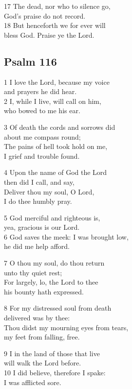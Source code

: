 17 The dead, nor who to silence go,\\
God’s praise do not record.\\
18 But henceforth we for ever will\\
bless God. Praise ye the Lord.

\begin{center}
\quad{}\quad{}
\end{center}

\subsection*{Psalm 116}

1 I love the Lord, because my voice\\
and prayers he did hear.\\
2 I, while I live, will call on him,\\
who bowed to me his ear.

3 Of death the cords and sorrows did\\
about me compass round;\\
The pains of hell took hold on me,\\
I grief and trouble found.

4 Upon the name of God the Lord\\
then did I call, and say,\\
Deliver thou my soul, O Lord,\\
I do thee humbly pray.

5 God merciful and righteous is,\\
yea, gracious is our Lord.\\
6 God saves the meek: I was brought low,\\
he did me help afford.

7 O thou my soul, do thou return\\
unto thy quiet rest;\\
For largely, lo, the Lord to thee\\
his bounty hath expressed.

8 For my distressed soul from death\\
delivered was by thee:\\
Thou didst my mourning eyes from tears,\\
my feet from falling, free.

9 I in the land of those that live\\
will walk the Lord before.\\
10 I did believe, therefore I spake:\\
I was afflicted sore.

